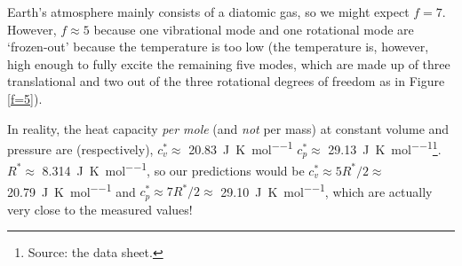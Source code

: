 Earth's atmosphere mainly consists of a diatomic gas, so we might expect \(f=7\). However, \(f\approx5\) because one vibrational mode and one rotational mode are `frozen-out' because the temperature is too low (the temperature is, however, high enough to fully excite the remaining five modes, which are made up of three translational and two out of the three rotational degrees of freedom as in Figure \ref{f=5}).

In reality, the heat capacity \textit{per mole} (and \textit{not} per mass) at constant volume and pressure are (respectively), \(c_v^*\approx\) \qty{20.83}{\joule\per\kelvin\per\mole} \(c_p^*\approx\) \qty{29.13}{\joule\per\kelvin\per\mole}\footnote{Source: the data sheet.}. \(R^*\approx\) \qty{8.314}{\joule\per\kelvin\per\mole}, so our predictions would be \(c_v^*\approx 5R^*/2\approx\) \qty{20.79}{\joule\per\kelvin\per\mole} and \(c_p^*\approx 7R^*/2\approx\) \qty{29.10}{\joule\per\kelvin\per\mole}, which are actually very close to the measured values!

